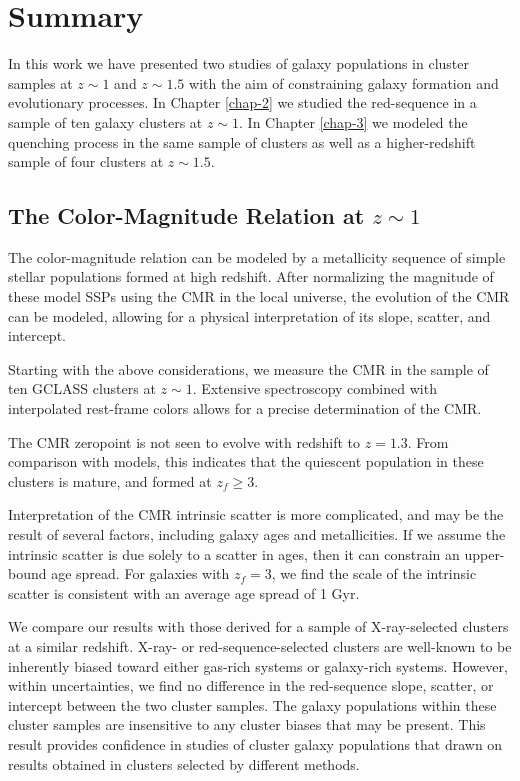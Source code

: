 \chapter{Summary}

In this work we have presented two studies of galaxy populations in cluster samples at $z\sim1$ and $z\sim1.5$ with the aim of constraining galaxy formation and evolutionary processes.
In Chapter \ref{chap-2} we studied the red-sequence in a sample of ten galaxy clusters at $z\sim1$.
In Chapter \ref{chap-3} we modeled the quenching process in the same sample of clusters as well as a higher-redshift sample of four clusters at $z\sim1.5$.

\section{The Color-Magnitude Relation at $z\sim1$}

The color-magnitude relation can be modeled by a metallicity sequence of simple stellar populations formed at high redshift.
After normalizing the magnitude of these model SSPs using the CMR in the local universe, the evolution of the CMR can be modeled, allowing for a physical interpretation of its slope, scatter, and intercept.

Starting with the above considerations, we measure the CMR in the sample of ten GCLASS clusters at $z\sim1$.
Extensive spectroscopy combined with interpolated rest-frame colors allows for a precise determination of the CMR.

The CMR zeropoint is not seen to evolve with redshift to $z=1.3$.
From comparison with models, this indicates that the quiescent population in these clusters is mature, and formed at $z_f \geq 3$.

Interpretation of the CMR intrinsic scatter is more complicated, and may be the result of several factors, including galaxy ages and metallicities.
If we assume the intrinsic scatter is due solely to a scatter in ages, then it can constrain an upper-bound age spread.
For galaxies with $z_f=3$, we find the scale of the intrinsic scatter is consistent with an average age spread of 1 Gyr.


We compare our results with those derived for a sample of X-ray-selected clusters at a similar redshift.
X-ray- or red-sequence-selected clusters are well-known to be inherently biased toward either gas-rich systems or galaxy-rich systems.
However, within uncertainties, we find no difference in the red-sequence slope, scatter, or intercept between the two cluster samples.
The galaxy populations within these cluster samples are insensitive to any cluster biases that may be present.
This result provides confidence in studies of cluster galaxy populations that drawn on results obtained in clusters selected by different methods.

